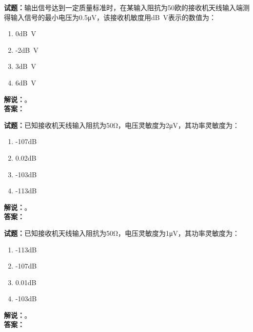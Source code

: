 \documentclass{ctexbook}
\begin{document}
\vspace{\baselineskip}

\noindent\textbf{试题：}输出信号达到一定质量标准时，在某输入阻抗为50欧的接收机天线输入端测得输入信号的最小电压为0.5μV，该接收机敏度用\unit[qualifier-mode=combine]{\deci\bel{}}V表示的数值为：
\begin{enumerate}[leftmargin=3em]
  \item 0\unit[qualifier-mode=combine]{\deci\bel{}}V
  \item -2\unit[qualifier-mode=combine]{\deci\bel{}}V
  \item 3\unit[qualifier-mode=combine]{\deci\bel{}}V
  \item 6\unit[qualifier-mode=combine]{\deci\bel{}}V
\end{enumerate}
\noindent\textbf{解说：}\textbf{}。\\\noindent\textbf{答案：}

\vspace{\baselineskip}

\noindent\textbf{试题：}已知接收机天线输入阻抗为50Ω，电压灵敏度为2μV，其功率灵敏度为：
\begin{enumerate}[leftmargin=3em]
  \item -107\unit[qualifier-mode=combine]{\deci\bel{}}
  \item 0.02\unit[qualifier-mode=combine]{\deci\bel{}}
  \item -103\unit[qualifier-mode=combine]{\deci\bel{}}
  \item -113\unit[qualifier-mode=combine]{\deci\bel{}}
\end{enumerate}
\noindent\textbf{解说：}\textbf{}。\\\noindent\textbf{答案：}

\vspace{\baselineskip}

\noindent\textbf{试题：}已知接收机天线输入阻抗为50Ω，电压灵敏度为1μV，其功率灵敏度为：
\begin{enumerate}[leftmargin=3em]
  \item -113\unit[qualifier-mode=combine]{\deci\bel{}}
  \item -107\unit[qualifier-mode=combine]{\deci\bel{}}
  \item 0.01\unit[qualifier-mode=combine]{\deci\bel{}}
  \item -103\unit[qualifier-mode=combine]{\deci\bel{}}
\end{enumerate}
\noindent\textbf{解说：}\textbf{}。\\\noindent\textbf{答案：}
\end{document}
